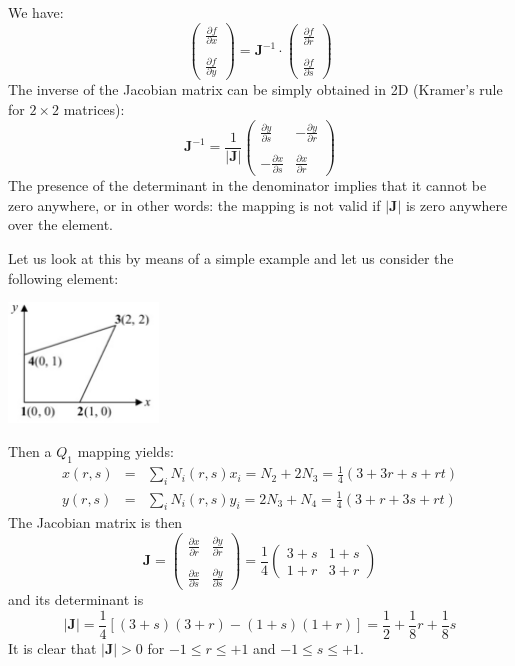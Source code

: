 We have:
\[
\left(
\begin{array}{c}
\frac{\partial f}{\partial x} \\ \\
\frac{\partial f}{\partial y}
\end{array}
\right)
=
{\bm J}^{-1} \cdot 
\left(
\begin{array}{c}
\frac{\partial f}{\partial r} \\ \\
\frac{\partial f}{\partial s}
\end{array}
\right)
\]
The inverse of the Jacobian matrix can be simply obtained in 
2D (Kramer's rule for $2\times2$ matrices):
\[
{\bm J}^{-1} = \frac{1}{|{\bm J}|} 
\left(
\begin{array}{cc}
\frac{\partial y}{\partial s} & -\frac{\partial y}{\partial r} \nonumber\\ \\
-\frac{\partial x}{\partial s} & \frac{\partial x}{\partial r} \nonumber
\end{array}
\right)
\]
The presence of the determinant in the denominator implies that it cannot 
be zero anywhere, or in other words: the mapping is not valid if $|{\bm J}|$
is zero anywhere over the element.

Let us look at this by means of a simple example and let us consider the following 
element:
\begin{center}
\includegraphics[width=4cm]{images/mappings/fournode/ex1}
\end{center}
Then a $Q_1$ mapping yields:
\begin{eqnarray}
x(r,s) &=& \sum_i N_i(r,s) x_i = N_2 + 2N_3 = \frac{1}{4} (3+3r+ s+rt) \\
y(r,s) &=& \sum_i N_i(r,s) y_i = 2N_3 + N_4 = \frac{1}{4} (3+r+ 3s+rt) 
\end{eqnarray}
The Jacobian matrix is then
\begin{equation}
{\bm J} = 
\left(
\begin{array}{cc}
\frac{\partial x}{\partial r} & \frac{\partial y}{\partial r} \nonumber\\ \\
\frac{\partial x}{\partial s} & \frac{\partial y}{\partial s} \nonumber
\end{array}
\right)
=
\frac{1}{4}
\left(
\begin{array}{cc}
3+s & 1+s \\
1+r & 3+r
\end{array}
\right)
\end{equation}
and its determinant is 
\begin{equation}
|{\bm J}|=\frac{1}{4} [(3+s)(3+r)-(1+s)(1+r)]=\frac{1}{2}+\frac{1}{8}r+\frac{1}{8}s
\end{equation}
It is clear that $|{\bm J}|>0$ for $-1\leq r \leq +1$ and $-1\leq s \leq +1$. 

